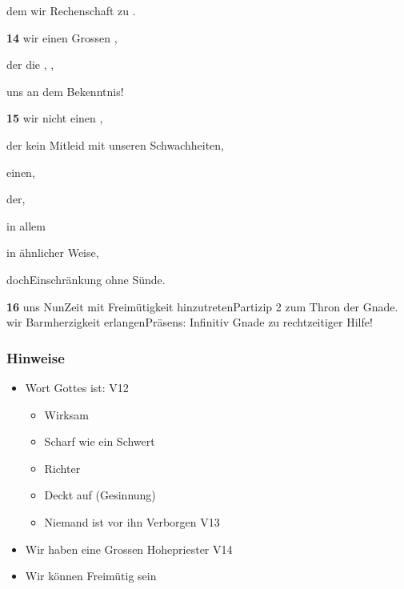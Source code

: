 \documentclass[12pt]{../../inc/mybib}
\begin{document}
        \hspace{2cm}dem wir Rechenschaft zu  .

\textbf{14}  wir  einen Grossen  ,

    \hspace{1cm}der die  , , 

    \hspace{1cm}  uns  an dem Bekenntnis!

\textbf{15}  wir  nicht einen ,

    \hspace{1cm}der kein Mitleid   mit unseren Schwachheiten, 

        \hspace{2cm} einen, 

            \hspace{3cm}der,  

            \hspace{3cm}in allem 

            \hspace{3cm}in ähnlicher Weise, 

doch{Einschränkung} ohne Sünde.

\textbf{16}   uns 
Nun{Zeit} mit Freimütigkeit hinzutreten{Partizip 2} zum Thron der Gnade. 
 wir Barmherzigkeit erlangen{Präsens: Infinitiv} 
 Gnade  zu rechtzeitiger Hilfe!

\subsubsection{Hinweise}
\begin{itemize}     
    \item Wort Gottes ist: V12
    \begin{itemize}       
        \item Wirksam
        \item Scharf wie ein Schwert
        \item Richter
        \item Deckt auf (Gesinnung)
        \item Niemand ist vor ihn Verborgen V13
    \end{itemize}
    \item Wir haben eine Grossen Hohepriester V14
    \item Wir können Freimütig sein
\end{itemize}
\end{document}
